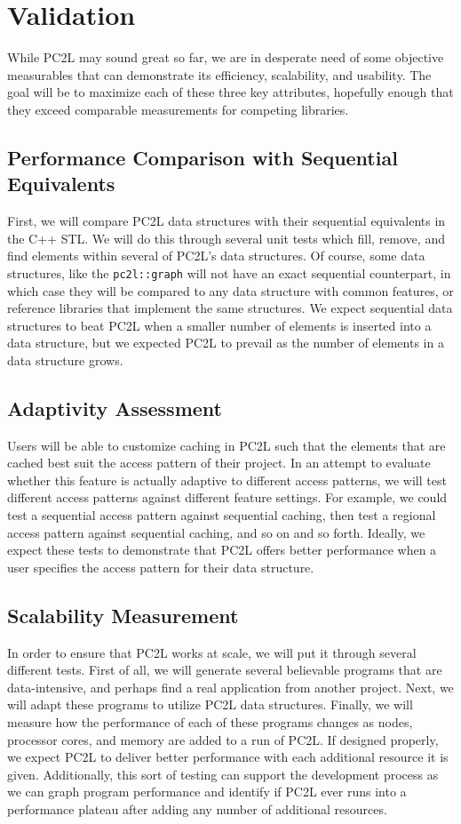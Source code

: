 \chapter{Validation}

While PC2L may sound great so far, we are in desperate need of some objective measurables that can demonstrate its efficiency, scalability, and usability. The goal will be to maximize each of these three key attributes, hopefully enough that they exceed comparable measurements for competing libraries. 


\section{Performance Comparison with Sequential Equivalents}
First, we will compare PC2L data structures with their sequential equivalents in the C++ STL. We will do this through several unit tests which fill, remove, and find elements within several of PC2L's data structures. Of course, some data structures, like the \texttt{pc2l::graph} will not have an exact sequential counterpart, in which case they will be compared to any data structure with common features, or reference libraries that implement the same structures. We expect sequential data structures to beat PC2L when a smaller number of elements is inserted into a data structure, but we expected PC2L to prevail as the number of elements in a data structure grows. 

\section{Adaptivity Assessment}
Users will be able to customize  caching in PC2L such that the elements that are cached best suit the access pattern of their project. In an attempt to evaluate whether this feature is actually adaptive to different access patterns, we will test different access patterns against different feature settings. For example, we could test a sequential access pattern against sequential caching, then test a regional access pattern against sequential caching, and so on and so forth. Ideally, we expect these tests to demonstrate that PC2L offers better performance when a user specifies the access pattern for their data structure. 

\section{Scalability Measurement}
In order to ensure that PC2L works at scale, we will put it through several different tests. First of all, we will generate several believable programs that are data-intensive, and perhaps find a real application from another project. Next, we will adapt these programs to utilize PC2L data structures. Finally, we will measure how the performance of each of these programs changes as nodes, processor cores, and memory are added to a run of PC2L. If designed properly, we expect PC2L to deliver better performance with each additional resource it is given. Additionally, this sort of testing can support the development process as we can graph program performance and identify if PC2L ever runs into a performance plateau after adding any number of additional resources.

